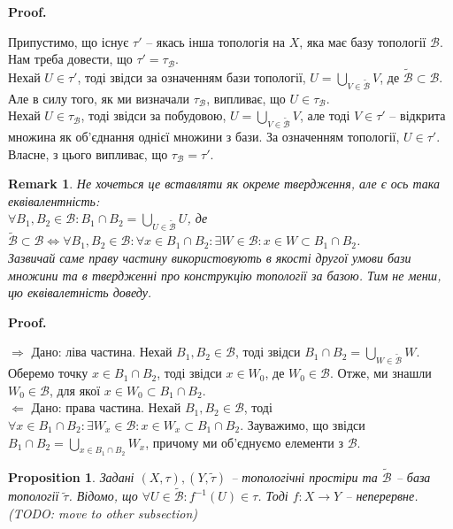 \documentclass[a4paper, 10pt]{article}
\makeatletter
\def\rightproof{$\boxed{\Rightarrow}$ }
\def\leftproof{$\boxed{\Leftarrow}$ }
\theoremstyle{theoremdd}
\newtheorem{proposition}[theorem]{Proposition}
\newtheorem{remark}[theorem]{Remark}
\renewenvironment{proof}[1][Proof.\\]{\par
\pushQED{\hfill \qed}%
\normalfont \topsep6\p@\@plus6\p@\relax
\trivlist
\item\relax
{\bfseries
#1\@addpunct{.}}\hspace\labelsep\ignorespaces
}{%
\popQED\endtrivlist\@endpefalse
}
\makeatother
\begin{document}
\begin{proof}
Припустимо, що існує $\tau'$ -- якась інша топологія на $X$, яка має базу топології $\mathcal{B}$. Нам треба довести, що $\tau' = \tau_{\mathcal{B}}$.\\
Нехай $U \in \tau'$, тоді звідси за означенням бази топології, $U = \displaystyle\bigcup_{V \in \mathcal{\tilde{B}}} V$, де $\mathcal{\tilde{B}} \subset \mathcal{B}$. Але в силу того, як ми визначали $\tau_{\mathcal{B}}$, випливає, що $U \in \tau_{\mathcal{B}}$.\\
Нехай $U \in \tau_{\mathcal{B}}$, тоді звідси за побудовою, $U = \displaystyle\bigcup_{V \in \mathcal{\tilde{B}}} V$, але тоді $V \in \tau'$ -- відкрита множина як об'єднання однієї множини з бази. За означенням топології, $U \in \tau'$.\\
Власне, з цього випливає, що $\tau_{\mathcal{B}} = \tau'$.
\end{proof}

\begin{remark}
Не хочеться це вставляти як окреме твердження, але є ось така еквівалентність:\\
$\forall B_1,B_2 \in \mathcal{B}: B_1 \cap B_2 = \displaystyle\bigcup_{U \in \mathcal{\tilde{B}}} U$, де $\mathcal{\tilde{B}} \subset \mathcal{B} \iff \forall B_1,B_2 \in \mathcal{B}: \forall x \in B_1 \cap B_2: \exists W \in \mathcal{B}: x \in W \subset B_1 \cap B_2$.\\
Зазвичай саме праву частину використовують в якості другої умови бази множини та в твердженні про конструкцію топології за базою. Тим не менш, цю еквівалетність доведу.
\end{remark}

\begin{proof}
\rightproof Дано: ліва частина. Нехай $B_1,B_2 \in \mathcal{B}$, тоді звідси $B_1 \cap B_2 = \displaystyle\bigcup_{W \in \mathcal{\tilde{B}}} W$. Оберемо точку $x \in B_1 \cap B_2$, тоді звідси $x \in W_0$, де $W_0 \in \mathcal{B}$. Отже, ми знашли $W_0 \in \mathcal{B}$, для якої $x \in W_0 \subset B_1 \cap B_2$.
\bigskip \\
\leftproof Дано: права частина. Нехай $B_1,B_2 \in \mathcal{B}$, тоді $\forall x \in B_1 \cap B_2: \exists W_x \in \mathcal{B}: x \in W_x \subset B_1 \cap B_2$. Зауважимо, що звідси $B_1 \cap B_2 = \displaystyle\bigcup_{x \in B_1 \cap B_2} W_x$, причому ми об'єднуємо елементи з $\mathcal{B}$. 
\end{proof}

\begin{proposition}
Задані $(X,\tau), (Y,\tilde{\tau})$ -- топологічні простіри та $\tilde{\mathcal{B}}$ -- база топології $\tilde{\tau}$. Відомо, що $\forall U \in \tilde{\mathcal{B}}: f^{-1}(U) \in \tau$. Тоді $f \colon X \to Y$ -- неперервне. (TODO: move to other subsection)
\end{proposition}
\end{document}
